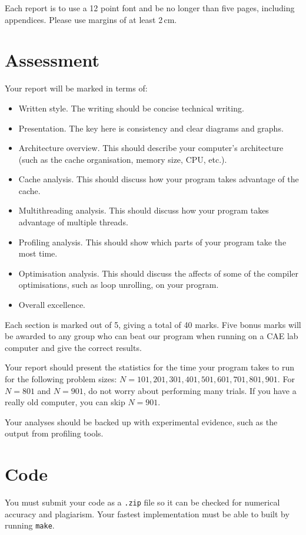 \documentclass[a4paper,11pt]{article}
\newcommand{\code}[1]{\texttt{#1}}
\begin{document}
Each report is to use a 12 point font and be no longer than five
pages, including appendices.  Please use margins of at least 2\,cm.


\section{Assessment}

Your report will be marked in terms of:
%
\begin{itemize}
\item Written style.  The writing should be concise technical writing.
\item Presentation.  The key here is consistency and clear diagrams
  and graphs.
\item Architecture overview.  This should describe your computer's
  architecture (such as the cache organisation, memory size, CPU,
  etc.).
\item Cache analysis.  This should discuss how your program takes
  advantage of the cache.  
\item Multithreading analysis.  This should discuss how your program
  takes advantage of multiple threads.
\item Profiling analysis.  This should show which parts of your program take the most time.
\item Optimisation analysis.  This should discuss the affects of some
  of the compiler optimisations, such as loop unrolling, on your
  program.
\item Overall excellence.
\end{itemize}
%
Each section is marked out of 5, giving a total of 40 marks.  Five
bonus marks will be awarded to any group who can beat our program when
running on a CAE lab computer and give the correct results.

Your report should present the statistics for the time your program
takes to run for the following problem sizes: $N=101, 201, 301, 401,
501, 601, 701, 801, 901$.  For $N=801$ and $N=901$, do not worry about
performing many trials.  If you have a really old computer, you can
skip $N=901$.

Your analyses should be backed up with experimental evidence, such as
the output from profiling tools.




\section{Code}

You must submit your code as a \code{.zip} file so it can be checked
for numerical accuracy and plagiarism.  Your fastest implementation
must be able to built by running \code{make}.
\end{document}
